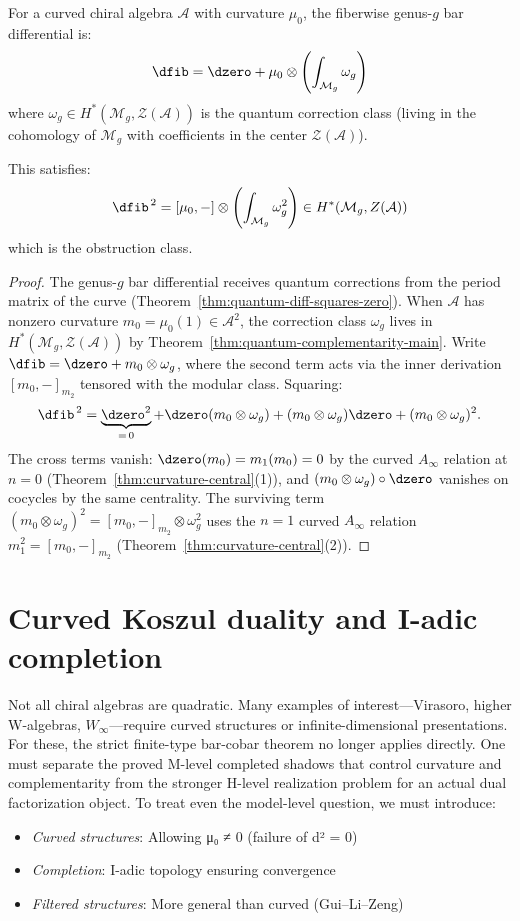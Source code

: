 \begin{corollary}\label{cor:curved-differential}
For a curved chiral algebra $\mathcal{A}$ with curvature $\mu_0$, the fiberwise genus-$g$ bar
differential is:
\[\dfib = \dzero + \mu_0 \otimes \left(\int_{\mathcal{M}_g} \omega_g\right)\]
where $\omega_g \in H^*(\mathcal{M}_g, \mathcal{Z}(\mathcal{A}))$ is the quantum correction class (living in the cohomology of $\mathcal{M}_g$ with coefficients in the center $\mathcal{Z}(\mathcal{A})$).

This satisfies:
\[\dfib^{\,2} = [\mu_0, -] \otimes \left(\int_{\mathcal{M}_g} \omega_g^2\right)
\in H^*(\mathcal{M}_g, Z(\mathcal{A}))\]
which is the obstruction class.
\end{corollary}
\begin{proof}
The genus-$g$ bar differential receives quantum corrections from the
period matrix of the curve
(Theorem~\ref{thm:quantum-diff-squares-zero}).  When $\mathcal{A}$ has
nonzero curvature $m_0 = \mu_0(1) \in \mathcal{A}^2$, the correction
class $\omega_g$ lives in
$H^*(\mathcal{M}_g, \mathcal{Z}(\mathcal{A}))$ by
Theorem~\ref{thm:quantum-complementarity-main}.  Write
$\dfib = \dzero + m_0 \otimes \omega_g$, where the second term acts
via the inner derivation $[m_0, -]_{m_2}$ tensored with the modular
class.  Squaring:
\[
\dfib^{\,2}
= \underbrace{\dzero^2}_{=\,0}
+ \dzero(m_0 \otimes \omega_g)
+ (m_0 \otimes \omega_g)\dzero
+ (m_0 \otimes \omega_g)^2.
\]
The cross terms vanish: $\dzero(m_0) = m_1(m_0) = 0$ by the curved
$A_\infty$ relation at $n = 0$
(Theorem~\ref{thm:curvature-central}(1)), and
$(m_0 \otimes \omega_g) \circ \dzero$ vanishes on cocycles by the
same centrality.  The surviving term
$(m_0 \otimes \omega_g)^2 = [m_0, -]_{m_2} \otimes \omega_g^2$
uses the $n = 1$ curved $A_\infty$ relation $m_1^2 = [m_0, -]_{m_2}$
(Theorem~\ref{thm:curvature-central}(2)).
\end{proof}

\section{Curved Koszul duality and I-adic completion}
\label{sec:curved-koszul-i-adic}

Not all chiral algebras are quadratic. Many examples of interest---Virasoro, higher W-algebras, 
$W_\infty$---require curved structures or infinite-dimensional presentations. For these, 
the strict finite-type bar-cobar theorem no longer applies directly.  One must
separate the proved M-level completed shadows that control curvature and
complementarity from the stronger H-level realization problem for an actual dual
factorization object.  To treat even the model-level question, we must introduce:
\begin{itemize}
\item \emph{Curved structures}: Allowing μ₀ ≠ 0 (failure of d² = 0)
\item \emph{Completion}: I-adic topology ensuring convergence
\item \emph{Filtered structures}: More general than curved (Gui--Li--Zeng)
\end{itemize}

